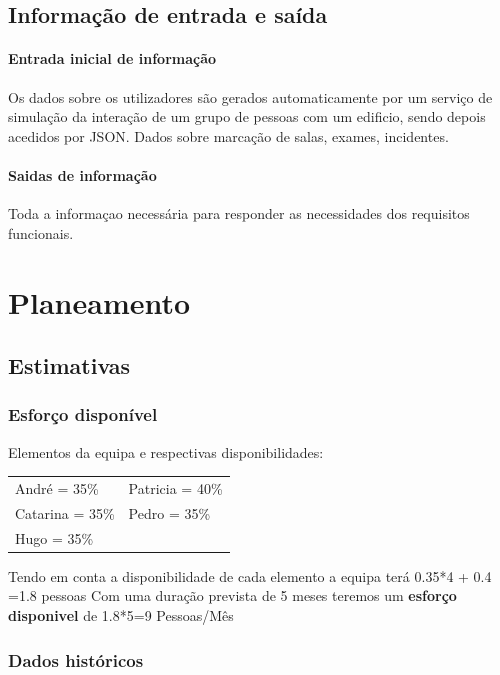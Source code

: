 \documentclass[a4paper]{report}
\begin{document}
\section{Informação de entrada e saída}
\subsubsection*{Entrada inicial de informação}
    Os dados sobre os utilizadores são gerados automaticamente por um serviço de simulação da interação de um grupo de pessoas com um edificio, sendo depois acedidos por JSON.
    Dados sobre marcação de salas, exames, incidentes.
\subsubsection*{Saidas de informação}
    Toda a informaçao necessária para responder as necessidades dos requisitos funcionais.
\chapter{Planeamento}
\section{Estimativas}
\subsection{Esforço disponível}
Elementos da equipa e respectivas disponibilidades:\\

\begin{tabularx}{\textwidth}{XX}
	André = 35\%    & Patricia = 40\% \\
	Catarina = 35\% & Pedro = 35\%    \\
	Hugo = 35\%     &
\end{tabularx}
\linebreak\linebreak
Tendo em conta a disponibilidade de cada elemento a equipa terá 0.35*4 + 0.4 =1.8 pessoas\linebreak
Com uma duração prevista de 5 meses teremos um \textbf{esforço disponivel} de 1.8*5=9 Pessoas/Mês
\subsection{Dados históricos}
\end{document}
